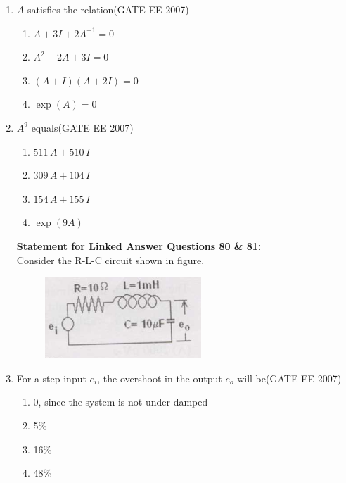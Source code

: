 \documentclass[a4paper,10pt]{exam}
\theoremstyle{remark}
\begin{document}
\begin{enumerate}
\item  $A$ satisfies the relation\hfill{(GATE EE 2007)}

\begin{multicols}{2}
\begin{enumerate}
    \item  $A + 3I + 2A^{-1} = 0$ 
 \item  $A^2 + 2A + 3I = 0$
 \item  $(A + I)(A + 2I) = 0$ 
 \item  $\exp(A) = 0$ 
\end{enumerate}
\end{multicols}

\item  $A^9$ equals\hfill{(GATE EE 2007)}

\begin{multicols}{2}
\begin{enumerate}
\item $511\, A + 510\, I$
\item $309\, A + 104\, I$
\item $154\, A + 155\, I$
\item $\exp(9A)$ 
\end{enumerate}
\end{multicols}

\noindent
\textbf{Statement for Linked Answer Questions 80 \& 81:}\\
Consider the R-L-C circuit shown in figure.
\begin{figure}[H]
    \centering
    \includegraphics[width=0.3\linewidth]{figs/Q 80,81.png} \caption{}     \label{fig:myfigure}
\end{figure}
\item  For a step-input $e_i$, the overshoot in the output $e_o$ will be\hfill{(GATE EE 2007)}

\begin{multicols}{4}
\begin{enumerate}
    \item  0, since the system is not under-damped
  \item 5\% 
  \item  16\% 
  \item  48\% 
\end{enumerate}
\end{multicols}


\end{enumerate}
\end{document}
